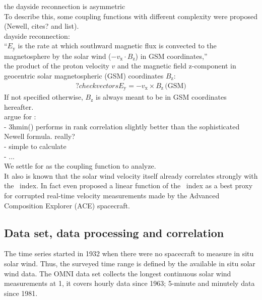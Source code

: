 the dayside reconnection is asymmetric\\

To describe this, some coupling functions with different complexity were proposed (Newell, cites? and list).\\

dayside reconnection:\\
``$E_\text{y}$ is the rate at which southward magnetic flux is convected to the magnetosphere by the solar wind ($-v_\text{x} \cdot B_\text{z}$) in GSM coordinates,'' \citep{Russell2007}\\

the product of the proton velocity $v$ and the magnetic field z-component in geocentric solar magnetospheric (GSM) coordinates $B_\text{z}$:
\begin{align}
	?check vectors  E_\text{y} = -v_\text{x} \times B_\text{z}\,\text{(GSM)}	\label{eq:coupling_vxB}
\end{align}
If not specified otherwise, $B_\text{z}$ is always meant to be in GSM coordinates hereafter.\\

argue for \vBz:\\
- 3hmin(\vBz) performs in rank correlation slightly better than the sophisticated Newell formula. really?\\
- simple to calculate\\
- ...\\

We settle for \vBz{} as the coupling function to analyze.\\

It also is known that the solar wind velocity itself already correlates strongly with the \Kp~index. In fact \citet{Machol2013} even proposed a linear function of the \Kp~index as a best proxy for corrupted real-time velocity measurements made by the Advanced Composition Explorer (ACE) spacecraft.\\

\subsection{Data set, data processing and correlation}
\label{sec:data_set__data_processing_and_correlation}
The \Kp{} time series started in 1932 when there were no spacecraft to measure in situ solar wind. Thus, the surveyed time range is defined by the available in situ solar wind data. The OMNI data set collects the longest continuous solar wind measurements at \SI{1}{\au},
it covers hourly data since 1963; 5-minute and minutely data since 1981.\\

